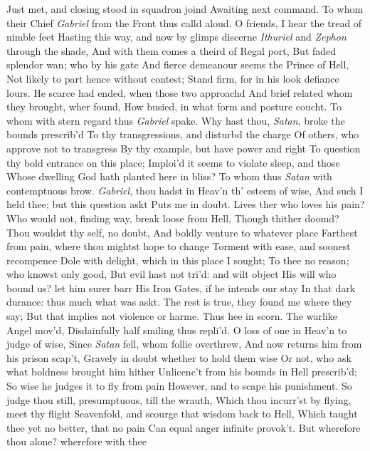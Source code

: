 \documentclass[11pt]{book}
\begin{document}
Just met, and closing stood in squadron joind 
Awaiting next command.  To whom their Chief 
\textit{Gabriel} from the Front thus calld aloud. 
\quad O friends, I hear the tread of nimble feet 
Hasting this way, and now by glimps discerne 
\textit{Ithuriel} and \textit{Zephon} through the shade, 
And with them comes a theird of Regal port, 
But faded splendor wan; who by his gate 
And fierce demeanour seems the Prince of Hell, 
Not likely to part hence without contest; 
Stand firm, for in his look defiance lours. 
\quad He scarce had ended, when those two approachd 
And brief related whom they brought, wher found, 
How busied, in what form and posture coucht. 
\quad To whom with stern regard thus \textit{Gabriel} spake. 
Why hast thou, \textit{Satan}, broke the bounds prescrib'd 
To thy transgressions, and disturbd the charge 
Of others, who approve not to transgress 
By thy example, but have power and right 
To question thy bold entrance on this place; 
Imploi'd it seems to violate sleep, and those 
Whose dwelling God hath planted here in bliss? 
\quad To whom thus \textit{Satan} with contemptuous brow. 
\textit{Gabriel}, thou hadst in Heav'n th' esteem of wise, 
And such I held thee; but this question askt 
Puts me in doubt.  Lives ther who loves his pain? 
Who would not, finding way, break loose from Hell, 
Though thither doomd?  Thou wouldst thy self, no doubt, 
And boldly venture to whatever place 
Farthest from pain, where thou mightst hope to change 
Torment with ease, and soonest recompence 
Dole with delight, which in this place I sought; 
To thee no reason; who knowst only good, 
But evil hast not tri'd: and wilt object 
His will who bound us? let him surer barr 
His Iron Gates, if he intends our stay 
In that dark durance: thus much what was askt. 
The rest is true, they found me where they say; 
But that implies not violence or harme. 
\quad Thus hee in scorn.  The warlike Angel mov'd, 
Disdainfully half smiling thus repli'd. 
O loss of one in Heav'n to judge of wise, 
Since \textit{Satan} fell, whom follie overthrew, 
And now returns him from his prison scap't, 
Gravely in doubt whether to hold them wise 
Or not, who ask what boldness brought him hither 
Unlicenc't from his bounds in Hell prescrib'd; 
So wise he judges it to fly from pain 
However, and to scape his punishment. 
So judge thou still, presumptuous, till the wrauth, 
Which thou incurr'st by flying, meet thy flight 
Seavenfold, and scourge that wisdom back to Hell, 
Which taught thee yet no better, that no pain 
Can equal anger infinite provok't. 
But wherefore thou alone? wherefore with thee 
\end{document}
